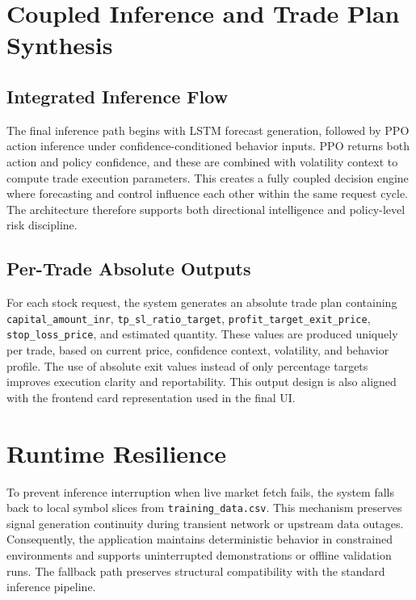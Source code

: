 \section{Coupled Inference and Trade Plan Synthesis}

\subsection{Integrated Inference Flow}

The final inference path begins with LSTM forecast generation, followed by PPO action inference under confidence-conditioned behavior inputs. PPO returns both action and policy confidence, and these are combined with volatility context to compute trade execution parameters. This creates a fully coupled decision engine where forecasting and control influence each other within the same request cycle. The architecture therefore supports both directional intelligence and policy-level risk discipline.

\subsection{Per-Trade Absolute Outputs}

For each stock request, the system generates an absolute trade plan containing \texttt{capital\_amount\_inr}, \texttt{tp\_sl\_ratio\_target}, \texttt{profit\_target\_exit\_price}, \texttt{stop\_loss\_price}, and estimated quantity. These values are produced uniquely per trade, based on current price, confidence context, volatility, and behavior profile. The use of absolute exit values instead of only percentage targets improves execution clarity and reportability. This output design is also aligned with the frontend card representation used in the final UI.

\section{Runtime Resilience}

To prevent inference interruption when live market fetch fails, the system falls back to local symbol slices from \texttt{training\_data.csv}. This mechanism preserves signal generation continuity during transient network or upstream data outages. Consequently, the application maintains deterministic behavior in constrained environments and supports uninterrupted demonstrations or offline validation runs. The fallback path preserves structural compatibility with the standard inference pipeline.
